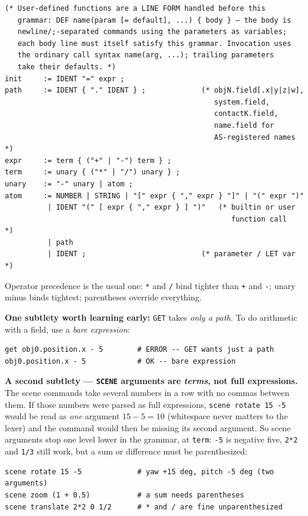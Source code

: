 \documentclass[11pt]{article}
\newcommand{\kw}[1]{\texttt{\uppercase{#1}}}
\newcommand{\code}[1]{\texttt{#1}}
\begin{document}
\begin{lstlisting}
(* User-defined functions are a LINE FORM handled before this
   grammar: DEF name(param [= default], ...) { body } — the body is
   newline/;-separated commands using the parameters as variables;
   each body line must itself satisfy this grammar. Invocation uses
   the ordinary call syntax name(arg, ...); trailing parameters
   take their defaults. *)
init     := IDENT "=" expr ;
path     := IDENT { "." IDENT } ;             (* objN.field[.x|y|z|w],
                                                 system.field,
                                                 contactK.field,
                                                 name.field for
                                                 AS-registered names *)
expr     := term { ("+" | "-") term } ;
term     := unary { ("*" | "/") unary } ;
unary    := "-" unary | atom ;
atom     := NUMBER | STRING | "[" expr { "," expr } "]" | "(" expr ")"
          | IDENT "(" [ expr { "," expr } ] ")"   (* builtin or user
                                                     function call   *)
          | path
          | IDENT ;                           (* parameter / LET var *)
\end{lstlisting}

Operator precedence is the usual one: \code{*} and \code{/} bind tighter
than \code{+} and \code{-}; unary minus binds tightest; parentheses
override everything.

\textbf{One subtlety worth learning early:} \kw{get} takes \emph{only a
path}. To do arithmetic with a field, use a \emph{bare expression}:
\begin{lstlisting}
get obj0.position.x - 5        # ERROR -- GET wants just a path
obj0.position.x - 5            # OK -- bare expression
\end{lstlisting}

\textbf{A second subtlety --- \kw{scene} arguments are \emph{terms},
not full expressions.} The scene commands take several numbers in a row
with no commas between them. If those numbers were parsed as full
expressions, \code{scene rotate 15 -5} would be read as \emph{one}
argument $15-5=10$ (whitespace never matters to the lexer) and the
command would then be missing its second argument. So scene arguments
stop one level lower in the grammar, at \code{term}: \code{-5} is
negative five, \code{2*2} and \code{1/3} still work, but a sum or
difference must be parenthesized:

\begin{lstlisting}
scene rotate 15 -5             # yaw +15 deg, pitch -5 deg (two arguments)
scene zoom (1 + 0.5)           # a sum needs parentheses
scene translate 2*2 0 1/2      # * and / are fine unparenthesized
\end{lstlisting}
\end{document}
